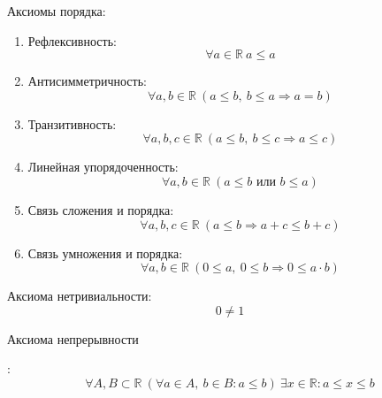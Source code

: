 Аксиомы порядка:
\begin{enumerate}
	\item Рефлексивность:
	\begin{equation*}
	\forall a \in \mathbb R \ a \leqslant a
	\end{equation*}
	
	\item Антисимметричность:
	\begin{equation*}
	\forall a, b \in \mathbb R \ (a \leqslant b, \ b \leqslant a \Rightarrow a = b)
	\end{equation*}
	
	\item Транзитивность:
	\begin{equation*}
	\forall a, b, c \in \mathbb R \ (a \leqslant b, \ b \leqslant c \Rightarrow a \leqslant c)
	\end{equation*}
	
	\item Линейная упорядоченность:
	\begin{equation*}
	\forall a, b \in \mathbb R \ (a \leqslant b \text{ или } b \leqslant a)
	\end{equation*}
	
	\item Связь сложения и порядка:
	\begin{equation*}
	\forall a, b, c \in \mathbb R \ (a \leqslant b \Rightarrow a + c \leqslant b + c)
	\end{equation*}
	
	\item Связь умножения и порядка:
	\begin{equation*}
	\forall a, b \in \mathbb R \ (0 \leqslant a, \ 0 \leqslant b \Rightarrow 0 \leqslant a \cdot b)
	\end{equation*}
\end{enumerate}

Аксиома нетривиальности:
\begin{equation*}
0 \neq 1
\end{equation*}

\hypertarget{eq:continuity_axiom}{Аксиома непрерывности}:
\begin{equation*}
\forall A, B \subset \mathbb R \ (\forall a \in A, \ b \in B \colon a \leqslant b) \
\exists x \in \mathbb R \colon a \leqslant x \leqslant b
\end{equation*}